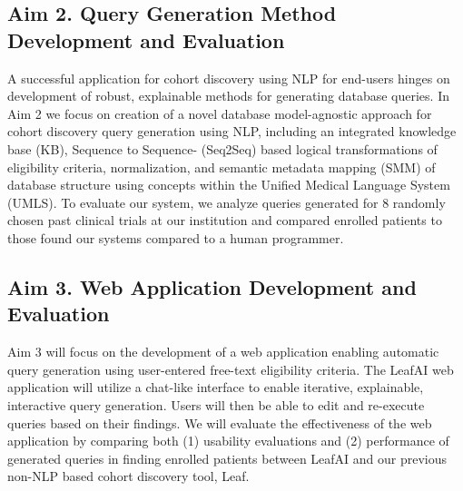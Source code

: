 \documentclass[../main.tex]{subfiles}
\begin{document}
\subsection{Aim 2. Query Generation Method Development and Evaluation}
A successful application for cohort discovery using NLP for end-users hinges on development of robust, explainable methods for generating database queries. In Aim 2 we focus on creation of a novel database model-agnostic approach for cohort discovery query generation using NLP, including an integrated knowledge base (KB), Sequence to Sequence- (Seq2Seq) based logical transformations of eligibility criteria, normalization, and semantic metadata mapping (SMM) of database structure using concepts within the Unified Medical Language System (UMLS). To evaluate our system, we analyze queries generated for 8 randomly chosen past clinical trials at our institution and compared enrolled patients to those found our systems compared to a human programmer.

\subsection{Aim 3. Web Application Development and Evaluation}
Aim 3 will focus on the development of a web application enabling automatic query generation using user-entered free-text eligibility criteria. The LeafAI web application will utilize a chat-like interface to enable iterative, explainable, interactive query generation. Users will then be able to edit and re-execute queries based on their findings. We will evaluate the effectiveness of the web application by comparing both (1) usability evaluations and (2) performance of generated queries in finding enrolled patients between LeafAI and our previous non-NLP based cohort discovery tool, Leaf.

\newpage
\end{document}

